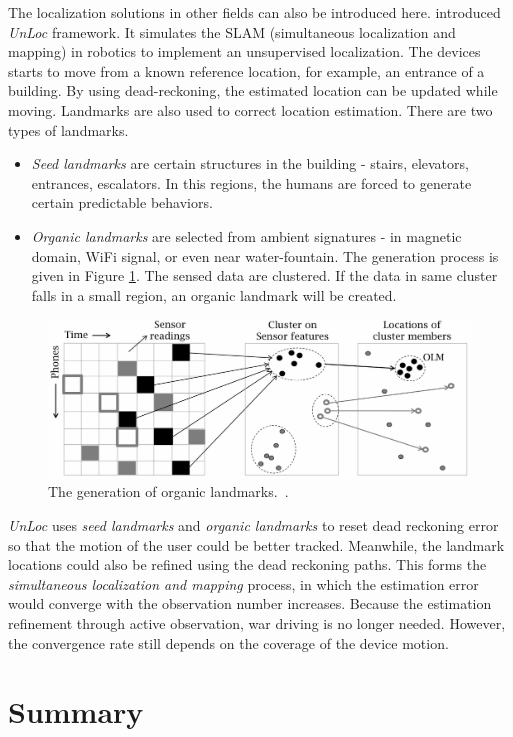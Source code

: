 \documentclass[letterpaper]{article}
\begin{document}
The localization solutions in other fields can also be introduced here.
\cite{Wang:2012:NNW:2307636.2307655} introduced \emph{UnLoc} framework.
It simulates the SLAM (simultaneous localization and mapping) in robotics to implement an unsupervised localization.
The devices starts to move from a known reference location, for example, an entrance of a building.
By using dead-reckoning, the estimated location can be updated while moving.
Landmarks are also used to correct location estimation.
There are two types of landmarks.
\begin{itemize}
	\item \emph{Seed landmarks} are certain structures in the building - stairs, elevators, entrances, escalators.
	In this regions, the humans are forced to generate certain predictable behaviors.
	\item \emph{Organic landmarks} are selected from ambient signatures - in magnetic domain, WiFi signal, or even near water-fountain.
	The generation process is given in Figure \ref{fig:olm}.
	The sensed data are clustered.
	If the data in same cluster falls in a small region, an organic landmark will be created.
\end{itemize}
\begin{figure}
	\centering
	\includegraphics[width=0.9\linewidth]{fig/OLM.png}
	\caption{The generation of organic landmarks.~\cite{Wang:2012:NNW:2307636.2307655}.}
	\label{fig:olm}
\end{figure}
\emph{UnLoc} uses \emph{seed landmarks} and \emph{organic landmarks} to reset dead reckoning error so that the motion of the user could be better tracked.
Meanwhile, the landmark locations could also be refined using the dead reckoning paths. 
This forms the \emph{simultaneous localization and mapping} process, in which the estimation error would converge with the observation number increases.
Because the estimation refinement through active observation, war driving is no longer needed.
However, the convergence rate still depends on the coverage of the device motion.


\section{Summary}
\end{document}
